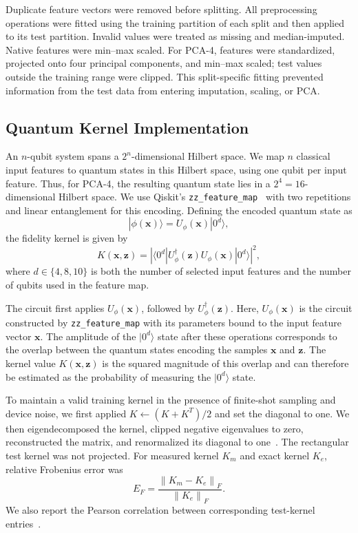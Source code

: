 \documentclass[letterpaper]{article} %
\begin{document}
Duplicate feature vectors were removed before splitting. All preprocessing operations were fitted using the training partition of each split and then applied to its test partition. Invalid values were treated as missing and median-imputed. Native features were min--max scaled. For PCA-4, features were standardized, projected onto four principal components, and min--max scaled; test values outside the training range were clipped. This split-specific fitting prevented information from the test data from entering imputation, scaling, or PCA.

\subsection{Quantum Kernel Implementation}

An $n$-qubit system spans a $2^n$-dimensional Hilbert space. We map $n$ classical input features to quantum states in this Hilbert space, using one qubit per input feature. Thus, for PCA-4, the resulting quantum state lies in a $2^4=16$-dimensional Hilbert space. We use Qiskit's \texttt{zz\_feature\_map}~\cite{qiskit2024} with two repetitions and linear entanglement for this encoding. Defining the encoded quantum state as
\[
|\phi(\mathbf{x})\rangle = U_{\phi}(\mathbf{x})|0^d\rangle,
\]
the fidelity kernel is given by
\begin{equation}
K(\mathbf{x},\mathbf{z})
=
\left|
\langle 0^d|
U_{\phi}^{\dagger}(\mathbf{z})
U_{\phi}(\mathbf{x})
|0^d\rangle
\right|^2,
\label{eq:fidelity-kernel}
\end{equation}
where $d \in \{4,8,10\}$ is both the number of selected input features and the number of qubits used in the feature map.

The circuit first applies $U_{\phi}(\mathbf{x})$, followed by $U_{\phi}^{\dagger}(\mathbf{z})$. Here, $U_{\phi}(\mathbf{x})$ is the circuit constructed by \texttt{zz\_feature\_map} with its parameters bound to the input feature vector $\mathbf{x}$. The amplitude of the $|0^d\rangle$ state after these operations corresponds to the overlap between the quantum states encoding the samples $\mathbf{x}$ and $\mathbf{z}$. The kernel value $K(\mathbf{x},\mathbf{z})$ is the squared magnitude of this overlap and can therefore be estimated as the probability of measuring the $|0^d\rangle$ state.

To maintain a valid training kernel in the presence of finite-shot sampling and device noise, we first applied $K\leftarrow(K+K^T)/2$ and set the diagonal to one. We then eigendecomposed the kernel, clipped negative eigenvalues to zero, reconstructed the matrix, and renormalized its diagonal to one~\cite{scholkopf2002,qiskit2024}. The rectangular test kernel was not projected. For measured kernel $K_m$ and exact kernel $K_e$, relative Frobenius error was
\begin{equation}
E_F=\frac{\left\|K_m-K_e\right\|_F}{\left\|K_e\right\|_F}.
\label{eq:frobenius-error}
\end{equation}
We also report the Pearson correlation between corresponding test-kernel entries~\cite{Frob,Pear}.
\end{document}
